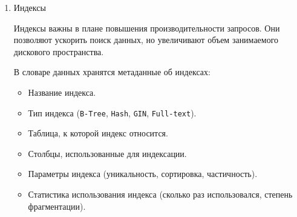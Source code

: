 \begin{enumerate}
\begin{enumerate}
        \item Атрибуты (столбцы) таблиц
    
        Кроме информации о таблице в целом, важно хранить сведения о ее столбцах и их свойствах:
        
        \begin{itemize}
            \item Имя столбца (\texttt{column\_name}).
            \item Тип данных (\texttt{VARCHAR}, \texttt{INTEGER}, \texttt{BOOLEAN} и т. д.).
            \item Размерность данных (\texttt{length}, \texttt{precision}, \texttt{scale}).
            \item Значение по умолчанию.
            \item Является ли столбец автоинкрементным (\texttt{SERIAL}, \texttt{IDENTITY} и т. д.).
            \item Описание (комментарий к столбцу, если поддерживается СУБД).
        \end{itemize}

        Пример SQL-запроса (MySQL, получение информации о столбцах таблицы):
        \begin{lstlisting}[language=SQL]
        SELECT COLUMN_NAME, DATA_TYPE, CHARACTER_MAXIMUM_LENGTH, IS_NULLABLE 
        FROM INFORMATION_SCHEMA.COLUMNS 
        WHERE TABLE_NAME = 'employees';
        \end{lstlisting}
    \end{enumerate}
    
    \item Индексы \autocites[§51.26]{PostgreSQLdocc51}[§52.11]{PostgreSQLdocc52}[§28.3.34]{Mysqldoc1}{MicrosoftLearnSQLserverInd}

    Индексы важны в плане повышения производительности запросов. Они позволяют ускорить поиск данных, но увеличивают объем занимаемого дискового пространства.

    В словаре данных хранятся метаданные об индексах:
    \begin{itemize}
        \item Название индекса.
        \item Тип индекса (\texttt{B-Tree}, \texttt{Hash}, \texttt{GIN}, \texttt{Full-text}).
        \item Таблица, к которой индекс относится.
        \item Столбцы, использованные для индексации.
        \item Параметры индекса (уникальность, сортировка, частичность).
        \item Статистика использования индекса (сколько раз использовался, степень фрагментации).
    \end{itemize}


\end{enumerate}
